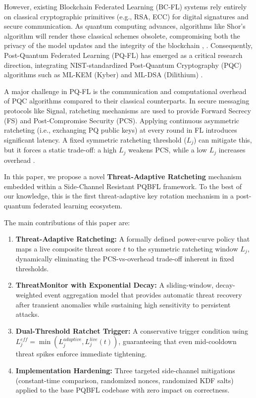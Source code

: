 \documentclass[journal, 10pt, twocolumn]{IEEEtran}
\begin{document}
However, existing Blockchain Federated Learning (BC-FL) systems rely entirely on classical cryptographic primitives (e.g., RSA, ECC) for digital signatures and secure communication. As quantum computing advances, algorithms like Shor's algorithm will render these classical schemes obsolete, compromising both the privacy of the model updates and the integrity of the blockchain \cite{pqfl_mdpi}, \cite{beskar}. Consequently, Post-Quantum Federated Learning (PQ-FL) has emerged as a critical research direction, integrating NIST-standardized Post-Quantum Cryptography (PQC) algorithms such as ML-KEM (Kyber) and ML-DSA (Dilithium) \cite{nist_pqc}.

A major challenge in PQ-FL is the communication and computational overhead of PQC algorithms compared to their classical counterparts. In secure messaging protocols like Signal, ratcheting mechanisms are used to provide Forward Secrecy (FS) and Post-Compromise Security (PCS). Applying continuous asymmetric ratcheting (i.e., exchanging PQ public keys) at every round in FL introduces significant latency. A fixed symmetric ratcheting threshold ($L_j$) can mitigate this, but it forces a static trade-off: a high $L_j$ weakens PCS, while a low $L_j$ increases overhead \cite{pqbfl1}.

In this paper, we propose a novel \textbf{Threat-Adaptive Ratcheting} mechanism embedded within a Side-Channel Resistant PQBFL framework. To the best of our knowledge, this is the first threat-adaptive key rotation mechanism in a post-quantum federated learning ecosystem.

The main contributions of this paper are:
\begin{enumerate}
    \item \textbf{Threat-Adaptive Ratcheting:} A formally defined power-curve policy that maps a live composite threat score $t$ to the symmetric ratcheting window $L_j$, dynamically eliminating the PCS-vs-overhead trade-off inherent in fixed thresholds.
    \item \textbf{ThreatMonitor with Exponential Decay:} A sliding-window, decay-weighted event aggregation model that provides automatic threat recovery after transient anomalies while sustaining high sensitivity to persistent attacks.
    \item \textbf{Dual-Threshold Ratchet Trigger:} A conservative trigger condition using $L_j^{eff} = \min(L_j^{adaptive}, L_j^{live}(t))$, guaranteeing that even mid-cooldown threat spikes enforce immediate tightening.
    \item \textbf{Implementation Hardening:} Three targeted side-channel mitigations (constant-time comparison, randomized nonces, randomized KDF salts) applied to the base PQBFL codebase with zero impact on correctness.
\end{enumerate}
\end{document}
